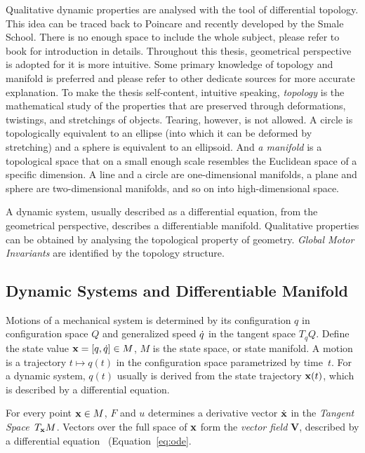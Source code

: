 Qualitative dynamic properties are analysed with the tool of differential topology.
This idea can be traced back to Poincare\citep{Poincar'e1899,Poincar'e1885} and recently developed by the Smale School\citep{Smale1970}.
There is no enough space to include the whole subject, please refer to book \citep{abraham1978foundations}for introduction in details.
Throughout this thesis,  geometrical perspective is adopted for it is more intuitive.
Some primary knowledge of topology and manifold is preferred and please refer to other dedicate sources for more accurate explanation. To make the thesis self-content, intuitive speaking,   \emph{topology} is the mathematical study of the properties that are preserved through deformations, twistings, and stretchings of objects. Tearing, however, is not allowed. A circle is topologically equivalent to an ellipse (into which it can be deformed by stretching) and a sphere is equivalent to an ellipsoid. And \emph{a manifold} is a topological space that on a small enough scale resembles the Euclidean space of a specific dimension.  A line and a circle are one-dimensional manifolds, a plane and sphere  are two-dimensional manifolds, and so on into high-dimensional space.


A dynamic system, usually described as a differential equation, from the geometrical perspective, describes a differentiable manifold.
Qualitative properties can be obtained by analysing the topological  property of geometry.
\emph{Global Motor Invariants} are identified by the topology structure.





\subsection{Dynamic Systems and Differentiable Manifold}
Motions of a mechanical system is determined by its configuration  $q$ in configuration space $Q$ and generalized speed $\dot{q}$ in the tangent space $T_{q}Q$. 
Define the state value $\mathbf{x}=[q,\dot{q}] \in M$,  $M$ is the state space, or state manifold.
A motion is a trajectory $t \mapsto q(t)$ in the configuration space parametrized by time~$t$.
For a dynamic system, $q(t)$ usually is derived from the state trajectory $\mathbf{x}(t)$, which is described by a differential equation. 



For every point $\mathbf{x} \in M$, 
$F$ and $u$ determines a derivative vector $\dot{\mathbf{x}}$ in the \emph{Tangent Space}~$T_{\mathbf{x}}M$. 
Vectors over the full space of $\mathbf{x}$ form the \emph{vector field} $\mathbf{V}$, described by a differential equation~ (Equation~\ref{eq:ode}.

